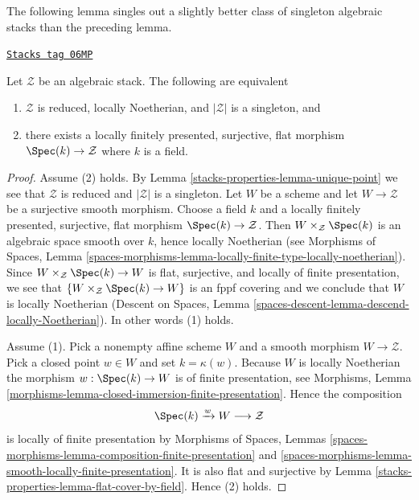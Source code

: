 The following lemma singles out a slightly better class of singleton
algebraic stacks than the preceding lemma.

\begin{lemma}
\label{stacks-properties-lemma-unique-point-better}
\href{https://stacks.math.columbia.edu/tag/06MP}{\texttt{Stacks tag 06MP}}

Let $\mathcal{Z}$ be an algebraic stack. The following are equivalent
\begin{enumerate}
\item $\mathcal{Z}$ is reduced, locally Noetherian, and $|\mathcal{Z}|$
is a singleton, and
\item there exists a locally finitely presented, surjective, flat morphism
$\Spec(k) \to \mathcal{Z}$ where $k$ is a field.
\end{enumerate}
\end{lemma}

\begin{proof}
Assume (2) holds. By
Lemma \ref{stacks-properties-lemma-unique-point}
we see that $\mathcal{Z}$ is reduced and $|\mathcal{Z}|$ is a singleton.
Let $W$ be a scheme and let $W \to \mathcal{Z}$ be a surjective smooth
morphism. Choose a field $k$ and a locally finitely presented, surjective,
flat morphism $\Spec(k) \to \mathcal{Z}$.
Then $W \times_\mathcal{Z} \Spec(k)$ is an algebraic space
smooth over $k$, hence locally Noetherian (see
Morphisms of Spaces, Lemma
\ref{spaces-morphisms-lemma-locally-finite-type-locally-noetherian}).
Since $W \times_\mathcal{Z} \Spec(k) \to W$
is flat, surjective, and locally of finite presentation, we see
that $\{W \times_\mathcal{Z} \Spec(k) \to W\}$ is an fppf covering
and we conclude that $W$ is locally Noetherian
(Descent on Spaces, Lemma
\ref{spaces-descent-lemma-descend-locally-Noetherian}).
In other words (1) holds.

\medskip\noindent
Assume (1). Pick a nonempty affine scheme $W$ and a smooth morphism
$W \to \mathcal{Z}$. Pick a closed point $w \in W$ and set
$k = \kappa(w)$. Because $W$ is locally Noetherian the morphism
$w : \Spec(k) \to W$ is of finite presentation, see
Morphisms, Lemma \ref{morphisms-lemma-closed-immersion-finite-presentation}.
Hence the composition
$$
\Spec(k) \xrightarrow{w} W \longrightarrow \mathcal{Z}
$$
is locally of finite presentation by
Morphisms of Spaces, Lemmas
\ref{spaces-morphisms-lemma-composition-finite-presentation} and
\ref{spaces-morphisms-lemma-smooth-locally-finite-presentation}.
It is also flat and surjective by
Lemma \ref{stacks-properties-lemma-flat-cover-by-field}.
Hence (2) holds.
\end{proof}

